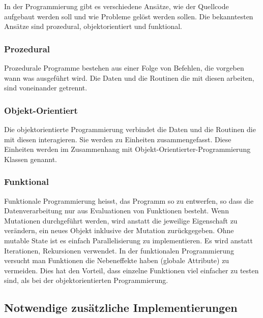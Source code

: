      In der Programmierung gibt es verschiedene Ansätze,
      wie der Quellcode aufgebaut werden soll und wie Probleme gelöst werden sollen.
      Die bekanntesten Ansätze sind prozedural, objektorientiert und funktional.

      \subsubsection{Prozedural\label{subsub:TechnologyParadigmaProzedural}}

        Prozedurale Programme bestehen aus einer Folge von Befehlen,
        die vorgeben wann was ausgeführt wird.
        Die Daten und die Routinen die mit diesen arbeiten, sind voneinander getrennt.

      \subsubsection{Objekt-Orientiert\label{subsub:TechnologyParadigmaObjectOriented}}

        Die objektorientierte Programmierung verbindet die Daten und
        die Routinen die mit diesen interagieren. Sie werden zu Einheiten zusammengefasst.
        Diese Einheiten werden im Zusammenhang mit Objekt-Orientierter-Programmierung Klassen genannt.

      \subsubsection{Funktional\label{subsub:TechnologyParadigmaFunctional}}

        Funktionale Programmierung heisst, das Programm so zu entwerfen, so dass die Datenverarbeitung nur aus Evaluationen von Funktionen besteht.
        Wenn Mutationen durchgeführt werden, wird anstatt die jeweilige Eigenschaft zu verändern,
        ein neues Objekt inklusive der Mutation zurückgegeben. Ohne mutable State ist es einfach Parallelisierung zu implementieren.
        Es wird anstatt Iterationen, Rekursionen verwendet.
        In der funktionalen Programmierung versucht man Funktionen die Nebeneffekte haben (globale Attribute) zu vermeiden.
        Dies hat den Vorteil, dass einzelne Funktionen viel einfacher zu testen sind, als bei der objektorientierten Programmierung.

      \subsection{Notwendige zusätzliche Implementierungen}


